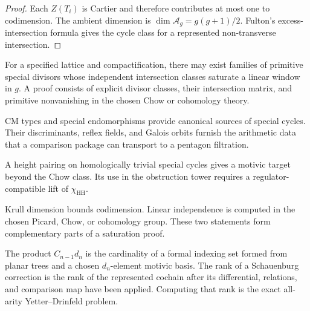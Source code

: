 \begin{proof}
Each \(Z(T_i)\) is Cartier and therefore contributes at most one to
codimension.  The ambient dimension is
\(\dim\mathcal A_g=g(g+1)/2\).  Fulton's excess-intersection formula
gives the cycle class for a represented non-transverse intersection.
\end{proof}

\begin{conjecture}
\label{conj:primitive-humbert-heegner-saturation}
\ClaimStatusConjectured
For a specified lattice and compactification, there may exist families
of primitive special divisors whose independent intersection classes
saturate a linear window in \(g\).  A proof consists of explicit
divisor classes, their intersection matrix, and primitive
nonvanishing in the chosen Chow or cohomology theory.
\end{conjecture}

\begin{remark}
\label{rem:shimura-cm-type-cycle-source}
CM types and special endomorphisms provide canonical sources of
special cycles.  Their discriminants, reflex fields, and Galois
orbits furnish the arithmetic data that a comparison package can
transport to a pentagon filtration.
\end{remark}

\begin{remark}
\label{rem:beilinson-motivic-height-cm}
A height pairing on homologically trivial special cycles gives a
motivic target beyond the Chow class.  Its use in the obstruction
tower requires a regulator-compatible lift of
\(\chi_{\mathrm{HH}}\).
\end{remark}

\begin{remark}
\label{rem:manin-dichotomy-bounds}
Krull dimension bounds codimension.  Linear independence is computed
in the chosen Picard, Chow, or cohomology group.  These two statements
form complementary parts of a saturation proof.
\end{remark}

\begin{remark}
\label{rem:YD-delta-general-rule}
The product \(C_{n-1}d_n\) is the cardinality of a formal indexing set
formed from planar trees and a chosen \(d_n\)-element motivic basis.
The rank of a Schauenburg correction is the rank of the represented
cochain after its differential, relations, and comparison map have
been applied.  Computing that rank is the exact all-arity
Yetter--Drinfeld problem.
\end{remark}

